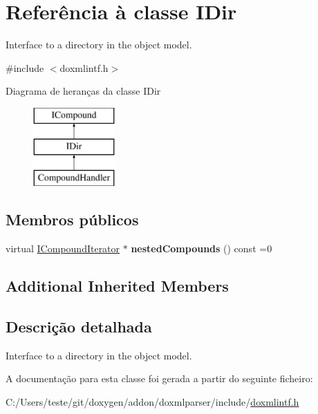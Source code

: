 \hypertarget{class_i_dir}{\section{Referência à classe I\-Dir}
\label{class_i_dir}
}


Interface to a directory in the object model.  




{\ttfamily \#include $<$doxmlintf.\-h$>$}

Diagrama de heranças da classe I\-Dir\begin{figure}[H]
\begin{center}
\leavevmode
\includegraphics[height=3.000000cm]{class_i_dir}
\end{center}
\end{figure}
\subsection*{Membros públicos}
\begin{DoxyCompactItemize}
\item 
\hypertarget{class_i_dir_a6a1aab20f15a204af0b8d3e8470817bd}{virtual \hyperlink{class_i_compound_iterator}{I\-Compound\-Iterator} $\ast$ {\bfseries nested\-Compounds} () const =0}\label{class_i_dir_a6a1aab20f15a204af0b8d3e8470817bd}

\end{DoxyCompactItemize}
\subsection*{Additional Inherited Members}


\subsection{Descrição detalhada}
Interface to a directory in the object model. 

A documentação para esta classe foi gerada a partir do seguinte ficheiro\-:\begin{DoxyCompactItemize}
\item 
C\-:/\-Users/teste/git/doxygen/addon/doxmlparser/include/\hyperlink{include_2doxmlintf_8h}{doxmlintf.\-h}\end{DoxyCompactItemize}
